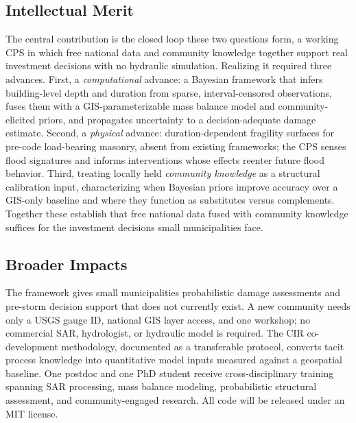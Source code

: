 \documentclass[11pt]{article}
\begin{document}
\subsection{Intellectual Merit}
\vspace{-0.3cm}
The central contribution is the closed loop these two questions form, a working
CPS in which free national data and community knowledge together support real
investment decisions with no hydraulic simulation.
Realizing it required three advances.
First, a \textit{computational} advance: a Bayesian framework that infers
building-level depth and duration from sparse, interval-censored observations,
fuses them with a GIS-parameterizable mass balance model and community-elicited
priors, and propagates uncertainty to a decision-adequate damage estimate.
Second, a \textit{physical} advance: duration-dependent fragility surfaces for
pre-code load-bearing masonry, absent from existing frameworks; the CPS senses
flood signatures and informs interventions whose effects reenter future flood
behavior.
Third, treating locally held \textit{community knowledge} as a structural
calibration input, characterizing when Bayesian priors improve accuracy over a
GIS-only baseline and where they function as substitutes versus complements.
Together these establish that free national data fused with community knowledge
suffices for the investment decisions small municipalities face.

\vspace{-0.5cm}
\subsection{Broader Impacts}
\vspace{-0.3cm}
The framework gives small municipalities probabilistic damage assessments and
pre-storm decision support that does not currently exist. A new community needs
only a USGS gauge ID, national GIS layer access, and one workshop; no commercial
SAR, hydrologist, or hydraulic model is required.
The CIR co-development methodology, documented as a transferable protocol,
converts tacit process knowledge into quantitative model inputs measured against
a geospatial baseline.
One postdoc and one PhD student receive cross-disciplinary training spanning SAR
processing, mass balance modeling, probabilistic structural assessment, and
community-engaged research. All code will be released under an MIT license.
\end{document}
